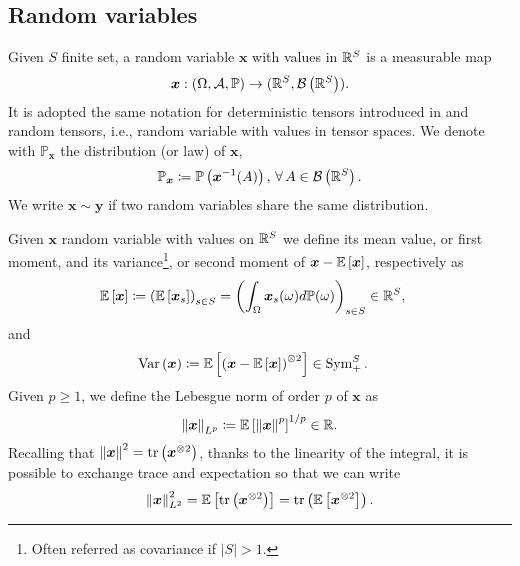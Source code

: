 \subsection{Random variables} \label{subsec:rv}

Given $S$ finite set, a random variable $\bm{x}$ with values in $\mathbb{R}^S$ is a measurable map
\begin{equation*}
	\bm{x}: (\Omega, \mathcal{A}, \mathbb{P}) \to (\mathbb{R}^S, \mathcal{B}\left(\mathbb{R}^S\right)).
\end{equation*}
It is adopted the same notation for deterministic tensors introduced in  and random tensors, i.e., random variable with values in tensor spaces. 
We denote with $\mathbb{P}_{\bm{x}}$ the distribution (or law) of $\bm{x}$, 
\begin{equation*}
	\mathbb{P}_{\bm{x}} \coloneqq \prob{\bm{x}^{-1}(A)}, \, \forall A \in \borel{\real^S}.
\end{equation*}
We write $\bm{x} \sim \bm{y}$ if two random variables share the same distribution.

\smallskip

Given $\bm{x}$ random variable with values on $\mathbb{R}^S$ we define its mean value, or first moment, and its variance\footnote{Often referred as covariance if $|S| > 1$.}, or second moment of $\bm{x} - \mathbb{E}_{\kern-0.5pt}\left[\bm{x}\right]$, respectively as
\begin{equation*}
	\begin{aligned}
		\mathbb{E}_{\kern-0.5pt}\left[\bm{x}\right] & \coloneqq \left(\mathbb{E}_{\kern-0.5pt}\left[\bm{x}_s\right]\right)_{s \in S} = \left(\int_{\Omega} \bm{x}_s(\omega) d\mathbb{P}(\omega)\right)_{s \in S} \in \mathbb{R}^S,
	\end{aligned}
\end{equation*}
and
\begin{equation*}
	\begin{aligned}
		\operatorname{Var}\left(\bm{x}\right) & \coloneqq \mathbb{E}_{\kern-0.5pt}\left[\left(\bm{x} - \mathbb{E}_{\kern-0.5pt}\left[\bm{x}\right]\right)^{\otimes 2}\right] \in \operatorname{Sym}_+^{S}.
	\end{aligned}
\end{equation*}
Given $p \geq 1$, we define the Lebesgue norm of order $p$ of $\bm{x}$ as
\begin{equation*}
	\left\lVert\bm{x}\right\rVert_{L^p} \coloneqq \mathbb{E}_{\kern-0.5pt}\left[\left\lVert\bm{x}\right\rVert^p\right]^{1/p} \in \mathbb{R}.
\end{equation*}
Recalling that $\left\lVert\bm{x}\right\rVert^2 = \operatorname{tr}\left(\bm{x}^{\otimes 2}\right)$, thanks to the linearity of the integral, it is possible to exchange trace and expectation so that we can write 
\begin{equation*}
	\left\lVert\bm{x}\right\rVert_{L^2}^2 = \mathbb{E}_{\kern-0.5pt}\left[\operatorname{tr}\left(\bm{x}^{\otimes 2}\right)\right] = \operatorname{tr}\left(\mathbb{E}_{\kern-0.5pt}\left[\bm{x}^{\otimes 2}\right]\right).
\end{equation*}

